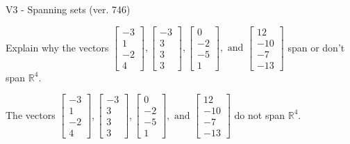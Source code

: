 \begin{exercise}
  \begin{exerciseTitle}V3 - Spanning sets (ver. 746)\end{exerciseTitle}
  \begin{exerciseStatement}
    Explain why the vectors \(\left[\begin{array}{r}
-3 \\
1 \\
-2 \\
4
\end{array}\right] , \left[\begin{array}{r}
-3 \\
3 \\
3 \\
3
\end{array}\right] , \left[\begin{array}{r}
0 \\
-2 \\
-5 \\
1
\end{array}\right] , \text{ and } \left[\begin{array}{r}
12 \\
-10 \\
-7 \\
-13
\end{array}\right]\) span or don't span \(\mathbb{R}^4\). 
	


  \end{exerciseStatement}
  \begin{exerciseAnswer}
   The vectors \(\left[\begin{array}{r}
-3 \\
1 \\
-2 \\
4
\end{array}\right] , \left[\begin{array}{r}
-3 \\
3 \\
3 \\
3
\end{array}\right] , \left[\begin{array}{r}
0 \\
-2 \\
-5 \\
1
\end{array}\right] , \text{ and } \left[\begin{array}{r}
12 \\
-10 \\
-7 \\
-13
\end{array}\right]\) 
  	 do not  
	span \(\mathbb{R}^4\).
  


  \end{exerciseAnswer}
\end{exercise}